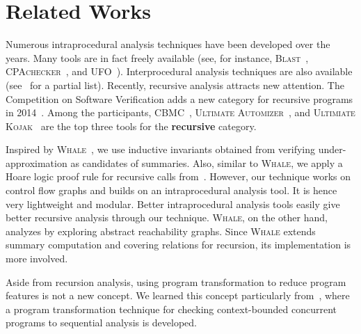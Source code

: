 
\chapter{Related Works}\label{ch:related}

Numerous intraprocedural analysis techniques have been developed over the years.
Many tools are in fact freely available (see, for instance,
\textsc{Blast}~\cite{BeyerHJM07}, \textsc{CPAchecker}~\cite{BeyerK11}, and
\textsc{UFO}~\cite{AlbarghouthiLGC12}).
Interprocedural analysis techniques are also available (see~\cite{RepsHS95,
BallR01,CousotCFMMMR05,CuoqKKPSY12,coverity,polyspace} for a partial list).
Recently, recursive analysis attracts new attention.
The Competition on Software Verification adds a new category for recursive
programs in 2014~\cite{svcomp14}.
Among the participants, \textsc{CBMC}~\cite{ClarkeKL04},
\textsc{Ultimate Automizer}~\cite{HeizmannCDEHLNSP13}, and
\textsc{Ultimiate Kojak}~\cite{ErmisNDHP14} are the top three tools for the
\textbf{recursive} category.

Inspired by \textsc{Whale}~\cite{AlbarghouthiGC12}, we use inductive invariants
obtained from verifying under-approximation as candidates of summaries.
Also, similar to \textsc{Whale}, we apply a Hoare logic proof rule for recursive
calls from~\cite{Oheimb99}.
However, our technique works on control flow graphs and builds on an
intraprocedural analysis tool.
It is hence very lightweight and modular.
Better intraprocedural analysis tools easily give better recursive analysis
through our technique.
\textsc{Whale}, on the other hand, analyzes by exploring abstract reachability
graphs.
Since \textsc{Whale} extends summary computation and covering relations for
recursion, its implementation is more involved.

Aside from recursion analysis, using program transformation to reduce program
features is not a new concept.
We learned this concept particularly from~\cite{LalR08,LalR09},
where a program transformation technique for checking context-bounded concurrent
programs to sequential analysis is developed.

